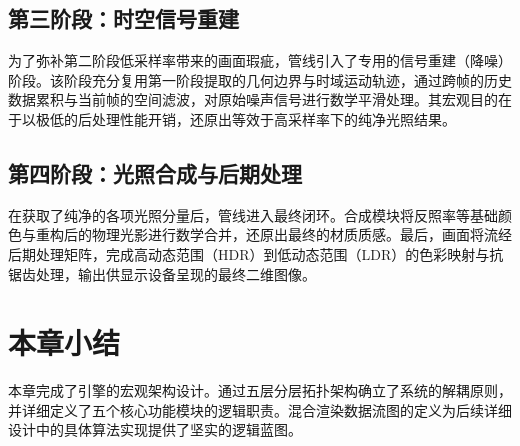 \subsection{第三阶段：时空信号重建}
为了弥补第二阶段低采样率带来的画面瑕疵，管线引入了专用的信号重建（降噪）阶段。该阶段充分复用第一阶段提取的几何边界与时域运动轨迹，通过跨帧的历史数据累积与当前帧的空间滤波，对原始噪声信号进行数学平滑处理。其宏观目的在于以极低的后处理性能开销，还原出等效于高采样率下的纯净光照结果。

\subsection{第四阶段：光照合成与后期处理}
在获取了纯净的各项光照分量后，管线进入最终闭环。合成模块将反照率等基础颜色与重构后的物理光影进行数学合并，还原出最终的材质质感。最后，画面将流经后期处理矩阵，完成高动态范围（HDR）到低动态范围（LDR）的色彩映射与抗锯齿处理，输出供显示设备呈现的最终二维图像。

\section{本章小结}
本章完成了引擎的宏观架构设计。通过五层分层拓扑架构确立了系统的解耦原则，并详细定义了五个核心功能模块的逻辑职责。混合渲染数据流图的定义为后续详细设计中的具体算法实现提供了坚实的逻辑蓝图。


